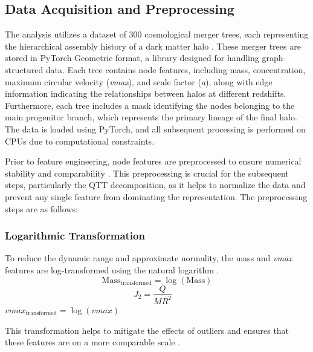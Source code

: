 \documentclass[twocolumn]{aastex631}
\begin{document}
\subsection{Data Acquisition and Preprocessing}
The analysis utilizes a dataset of 300 cosmological merger trees, each representing the hierarchical assembly history of a dark matter halo \citep{parkinson2007generatingdarkmatterhalo,jiang2013generatingmergertreesdark,chandrogómez2025accuracydarkmatterhalo}. These merger trees are stored in PyTorch Geometric format, a library designed for handling graph-structured data. Each tree contains node features, including mass, concentration, maximum circular velocity (\textit{vmax}), and scale factor (\textit{a}), along with edge information indicating the relationships between halos at different redshifts. Furthermore, each tree includes a mask identifying the nodes belonging to the main progenitor branch, which represents the primary lineage of the final halo. The data is loaded using PyTorch, and all subsequent processing is performed on CPUs due to computational constraints.

Prior to feature engineering, node features are preprocessed to ensure numerical stability and comparability \citep{cao2025imagepreprocessingframeworktimedomain,nerval2025atacamacosmologytelescopedevelopment}. This preprocessing is crucial for the subsequent steps, particularly the QTT decomposition, as it helps to normalize the data and prevent any single feature from dominating the representation. The preprocessing steps are as follows:

\subsubsection{Logarithmic Transformation}
To reduce the dynamic range and approximate normality, the mass and \textit{vmax} features are log-transformed using the natural logarithm \citep{seo2011darkenergylogtransformedconvergence,greiner2014logtransformingmatterpowerspectrum,rubira2021effectivefieldtheoryperturbative}.
\[
\text{Mass}_{\text{transformed}} = \log(\text{Mass})
\]
\citep{obrennan2024halomassfunctionshigh,müller2024massradiusrelationexoplanetsrevisited}
\[
J_2 = \frac{Q}{M R^2} \quad
\]
$\textit{vmax}_{\text{transformed}} = \log(\textit{vmax})$

This transformation helps to mitigate the effects of outliers and ensures that these features are on a more comparable scale \citep{stepanyuk2022multiscaleimagepreprocessingfeature,ge2023scalingtransformationsoriginslight}.
\end{document}
